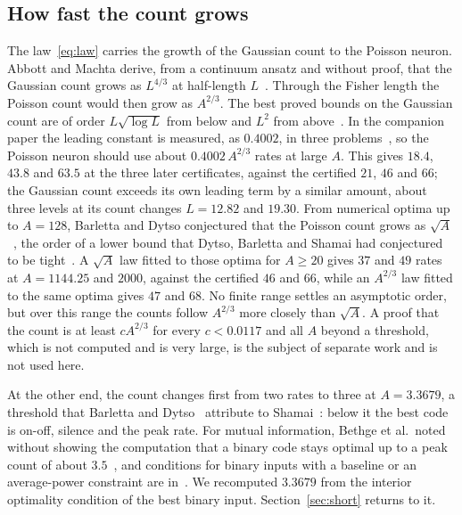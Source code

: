 \documentclass[journal]{IEEEtran}
\begin{document}
\subsection{How fast the count grows}
The law~\eqref{eq:law} carries the growth of the Gaussian count to the Poisson neuron. Abbott and Machta derive, from a continuum
ansatz and without proof, that the Gaussian count grows as $L^{4/3}$ at half-length $L$~\cite{Mattingly2018,AbbottMachta2019}.
Through the Fisher length the Poisson count would then grow as $A^{2/3}$. The best proved bounds on the Gaussian count are of order
$L\sqrt{\log L}$ from below and $L^2$ from above~\cite{WBD2025,DYPS2020}. In the companion paper the leading constant is measured, as
$0.4002$, in three problems~\cite{Paper1}, so the Poisson neuron should use about $0.4002\,A^{2/3}$ rates at large $A$. This gives
$18.4$, $43.8$ and $63.5$ at the three later certificates, against the certified $21$, $46$ and $66$; the Gaussian count exceeds its own
leading term by a similar amount, about three levels at its count changes $L = 12.82$ and $19.30$. From numerical optima up to
$A = 128$, Barletta and Dytso
conjectured that the Poisson count grows as $\sqrt A$~\cite{BarlettaDytso2022}, the order of a lower bound that Dytso, Barletta and
Shamai had conjectured to be tight~\cite{DBS2021}. A $\sqrt A$ law fitted to those optima for $A \ge 20$ gives $37$ and $49$ rates at
$A = 1144.25$ and $2000$, against the certified $46$ and $66$, while an $A^{2/3}$ law fitted to the same optima gives $47$ and $68$. No
finite range settles an asymptotic order, but over this range the counts follow $A^{2/3}$ more closely than $\sqrt A$. A proof that the count is at
least $cA^{2/3}$ for every $c < 0.0117$ and all $A$ beyond a threshold, which is not computed and is very large, is the subject of
separate work and is not used here.

At the other end, the count changes first from two rates to three at $A = 3.3679$, a threshold that Barletta and
Dytso~\cite{BarlettaDytso2022} attribute to Shamai~\cite{Shamai1990}: below it the best code is on-off, silence and the peak rate. For mutual information, Bethge et al.\ noted
without showing the computation that a binary code stays optimal up to a peak count of about $3.5$~\cite{Bethge2003}, and conditions
for binary inputs with a baseline or an average-power constraint are in~\cite{Cao2014b}. We recomputed $3.3679$ from the interior
optimality condition of the best binary input. Section~\ref{sec:short} returns to it.
\end{document}
